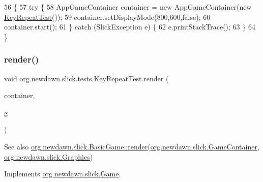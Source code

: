 \begin{DoxyCode}
56                                            \{
57         \textcolor{keywordflow}{try} \{
58             AppGameContainer container = \textcolor{keyword}{new} AppGameContainer(\textcolor{keyword}{new} \mbox{\hyperlink{classorg_1_1newdawn_1_1slick_1_1tests_1_1_key_repeat_test_afc09547e4d3e13751ea34732a0c23975}{KeyRepeatTest}}());
59             container.setDisplayMode(800,600,\textcolor{keyword}{false});
60             container.start();
61         \} \textcolor{keywordflow}{catch} (SlickException e) \{
62             e.printStackTrace();
63         \}
64     \}
\end{DoxyCode}
\mbox{\label{classorg_1_1newdawn_1_1slick_1_1tests_1_1_key_repeat_test_aaf889452510bb798a5827b2aad390dd1}} 
\subsubsection{\texorpdfstring{render()}{render()}}
{\footnotesize\ttfamily void org.\+newdawn.\+slick.\+tests.\+Key\+Repeat\+Test.\+render (\begin{DoxyParamCaption}\item[{\mbox{\hyperlink{classorg_1_1newdawn_1_1slick_1_1_game_container}{Game\+Container}}}]{container,  }\item[{\mbox{\hyperlink{classorg_1_1newdawn_1_1slick_1_1_graphics}{Graphics}}}]{g }\end{DoxyParamCaption})\hspace{0.3cm}{\ttfamily [inline]}}

\begin{DoxySeeAlso}{See also}
\mbox{\hyperlink{interfaceorg_1_1newdawn_1_1slick_1_1_game_af1a4670d43eb3ba04dfcf55ab1975b64}{org.\+newdawn.\+slick.\+Basic\+Game\+::render}}(\mbox{\hyperlink{classorg_1_1newdawn_1_1slick_1_1_game_container}{org.\+newdawn.\+slick.\+Game\+Container}}, \mbox{\hyperlink{classorg_1_1newdawn_1_1slick_1_1_graphics}{org.\+newdawn.\+slick.\+Graphics}}) 
\end{DoxySeeAlso}


Implements \mbox{\hyperlink{interfaceorg_1_1newdawn_1_1slick_1_1_game_af1a4670d43eb3ba04dfcf55ab1975b64}{org.\+newdawn.\+slick.\+Game}}.


